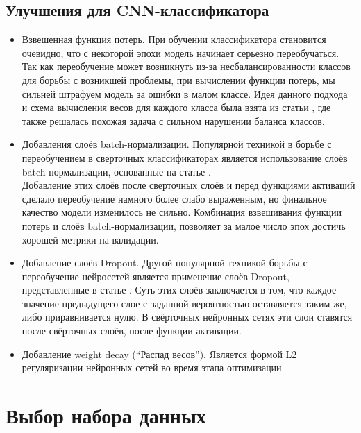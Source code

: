 \subsection{Улучшения для CNN-классификатора}
\begin{itemize}
\item Взвешенная функция потерь. При обучении классификатора становится очевидно, что с некоторой эпохи модель начинает серьезно переобучаться. Так как переобучение может возникнуть из-за несбалансированности классов для борьбы с возникшей проблемы, при вычислении функции потерь, мы сильней штрафуем модель за ошибки в малом классе. Идея данного подхода и схема вычисления весов для каждого класса была взята из статьи \cite{yueImbalancedMalwareImages2017a}, где также решалась похожая задача с сильном нарушении баланса классов.\\
\item Добавления слоёв batch-нормализации. Популярной техникой в борьбе с переобучением в сверточных классификаторах является использование слоёв batch-нормализации, основанные на статье \cite{ioffeBatchNormalizationAccelerating2015}.\\
Добавление этих слоёв после сверточных слоёв и перед функциями активаций сделало переобучение намного более слабо выраженным, но финальное качество модели изменилось не сильно. Комбинация взвешивания функции потерь и слоёв batch-нормализации, позволяет за малое число эпох достичь хорошей метрики на валидации.
\item Добавление слоёв Dropout. Другой популярной техникой борьбы с переобучение нейросетей является применение слоёв Dropout, представленные в статье \cite{srivastavaDropoutSimpleWay}. Суть этих слоёв заключается в том, что каждое значение предыдущего слое с заданной вероятностью оставляется таким же, либо приравнивается нулю. В свёрточных нейронных сетях эти слои ставятся после свёрточных слоёв, после функции активации.
\item Добавление weight decay (``Распад весов''). Является формой L2 регуляризации нейронных сетей во время этапа оптимизации.
\end{itemize}


\section{Выбор набора данных}

